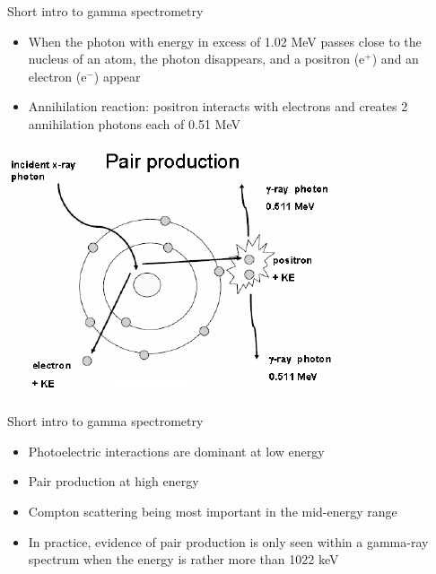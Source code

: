 \begin{frame}{Short intro to gamma spectrometry}

{}

\vskip0.3cm
\begin{exampleblock}{}

\begin{itemize}
\item When the photon with energy in excess of 1.02 MeV passes close to the nucleus of an atom, the photon disappears, and a positron (e$^{+}$) and an electron (e$^{-}$) appear 
\item Annihilation reaction: positron interacts with electrons and creates 2 annihilation photons each of 0.51 MeV
\end{itemize}

\end{exampleblock}

\centering
\includegraphics[scale=0.5]{figures/pairproduction.png}

\end{frame}

\begin{frame}{Short intro to gamma spectrometry}

\begin{exampleblock}{}

\begin{itemize}
\item Photoelectric interactions are dominant at low energy 
\item Pair production at high energy 
\item Compton scattering being most important in the mid-energy range 
\item In practice, evidence of pair production is only seen within a gamma-ray spectrum when the energy is rather more than 1022 keV
\end{itemize}

\end{exampleblock}

\end{frame}

